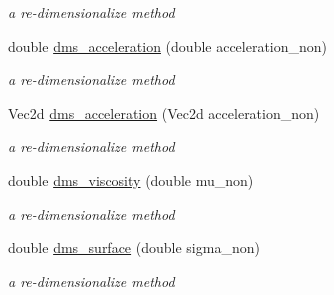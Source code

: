 \begin{CompactItemize}
\begin{CompactList}\small\item\em a re-dimensionalize method \item\end{CompactList}\item 
\hypertarget{classInitiation_7746aa0e130fbfdd4ef72d662eaf4fe5}{
double \hyperlink{classInitiation_7746aa0e130fbfdd4ef72d662eaf4fe5}{dms\_\-acceleration} (double acceleration\_\-non)}
\label{classInitiation_7746aa0e130fbfdd4ef72d662eaf4fe5}

\begin{CompactList}\small\item\em a re-dimensionalize method \item\end{CompactList}\item 
\hypertarget{classInitiation_c82bd7ac7f359587868b80b4498c4220}{
Vec2d \hyperlink{classInitiation_c82bd7ac7f359587868b80b4498c4220}{dms\_\-acceleration} (Vec2d acceleration\_\-non)}
\label{classInitiation_c82bd7ac7f359587868b80b4498c4220}

\begin{CompactList}\small\item\em a re-dimensionalize method \item\end{CompactList}\item 
\hypertarget{classInitiation_f867793b42e943a473d1132d0bbb721a}{
double \hyperlink{classInitiation_f867793b42e943a473d1132d0bbb721a}{dms\_\-viscosity} (double mu\_\-non)}
\label{classInitiation_f867793b42e943a473d1132d0bbb721a}

\begin{CompactList}\small\item\em a re-dimensionalize method \item\end{CompactList}\item 
\hypertarget{classInitiation_cbd8852ba19297b3278e96f6fb9ecb60}{
double \hyperlink{classInitiation_cbd8852ba19297b3278e96f6fb9ecb60}{dms\_\-surface} (double sigma\_\-non)}
\label{classInitiation_cbd8852ba19297b3278e96f6fb9ecb60}

\begin{CompactList}\small\item\em a re-dimensionalize method \item\end{CompactList}\end{CompactItemize}
